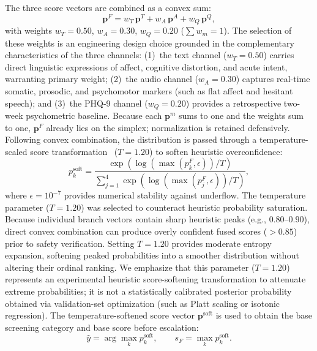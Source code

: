 \documentclass[10pt, conference, letterpaper]{IEEEtran}
\begin{document}
The three score vectors are combined as a convex sum:
\begin{equation}
  \mathbf{p}^F = w_T\,\mathbf{p}^T + w_A\,\mathbf{p}^A + w_Q\,\mathbf{p}^Q,
  \label{eq:fusion}
\end{equation}
with weights $w_T = 0.50$, $w_A = 0.30$, $w_Q = 0.20$ ($\sum w_m = 1$).
The selection of these weights is an engineering design choice grounded in the
complementary characteristics of the three channels:
(1)~the text channel ($w_T = 0.50$) carries direct linguistic expressions of affect,
cognitive distortion, and acute intent, warranting primary weight;
(2)~the audio channel ($w_A = 0.30$) captures real-time somatic, prosodic, and psychomotor markers
(such as flat affect and hesitant speech); and
(3)~the PHQ-9 channel ($w_Q = 0.20$) provides a retrospective two-week psychometric baseline.
Because each $\mathbf{p}^m$ sums to one and the weights sum to one,
$\mathbf{p}^F$ already lies on the simplex; normalization is retained
defensively.
Following convex combination, the distribution is passed through a
temperature-scaled score transformation~\cite{guo2017} ($T = 1.20$) to soften
heuristic overconfidence:
\begin{equation}
  p_k^{\text{soft}} = \frac{\exp(\log(\max(p_k^F, \epsilon))/T)}{\sum_{j=1}^4 \exp(\log(\max(p_j^F, \epsilon))/T)},
  \label{eq:temperature}
\end{equation}
where $\epsilon = 10^{-7}$ provides numerical stability against underflow.
The temperature parameter ($T = 1.20$) was selected to counteract heuristic probability saturation.
Because individual branch vectors contain sharp heuristic peaks (e.g., $0.80$--$0.90$), direct convex
combination can produce overly confident fused scores ($>0.85$) prior to safety verification.
Setting $T = 1.20$ provides moderate entropy expansion, softening peaked probabilities into a
smoother distribution without altering their ordinal ranking.
We emphasize that this parameter ($T = 1.20$) represents an experimental
heuristic score-softening transformation to attenuate extreme probabilities;
it is not a statistically calibrated posterior probability obtained via
validation-set optimization (such as Platt scaling or isotonic regression).
The temperature-softened score vector $\mathbf{p}^{\text{soft}}$ is used to obtain the base
screening category and base score before escalation:
\begin{equation}
  \hat{y} = \arg\max_k p_k^{\text{soft}},
  \qquad
  s_F = \max_k p_k^{\text{soft}}.
  \label{eq:prediction}
\end{equation}
\end{document}
